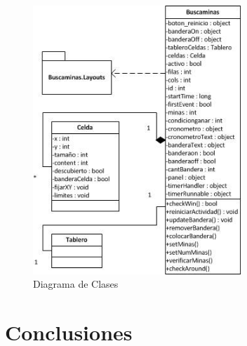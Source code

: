 \documentclass[11pt]{article} %
\begin{document}
\begin{center}

	\begin{figure}[h!]
  		\centering
    		\includegraphics[width=0.7\textwidth]{imagenes/diagramaClases.jpg}
  		\caption{Diagrama de Clases}
		\label{fig:diagclases}
	\end{figure}
\end{center}

\newpage
\thispagestyle{empty}

\section{Conclusiones}
\end{document}
